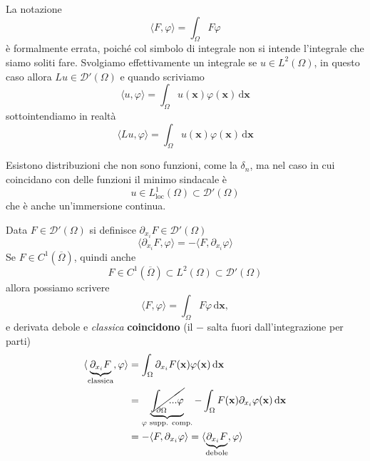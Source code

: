\documentclass[10pt,a4paper,twoside,openright]{book}
\newcommand{\x}{\mathbf{x}}
\newcommand{\de}{\,\mathrm d}
\newcommand{\dxx}{\de \x}
\begin{document}
\begin{nb}
	La notazione 
	\begin{equation*}
		\langle F,\varphi \rangle =\int _{\Omega } F\varphi 
	\end{equation*}
	è formalmente errata, poiché col simbolo di integrale non si intende l'integrale che siamo soliti fare. Svolgiamo effettivamente un integrale se $\displaystyle u\in L^{2}(\Omega)$, in questo caso allora $\displaystyle Lu\in \mathcal{D} '(\Omega)$ e quando scriviamo 
	\begin{equation*}
		\langle u,\varphi \rangle =\int _{\Omega } u(\x) \varphi (\x) \dxx
	\end{equation*}
	sottointendiamo in realtà
	\begin{equation*}
		\langle Lu,\varphi \rangle =\int _{\Omega } u(\x) \varphi (\x) \dxx
	\end{equation*}
\end{nb}
Esistono distribuzioni che non sono funzioni, come la $\displaystyle \delta _{n}$, ma nel caso in cui coincidano con delle funzioni il minimo sindacale è \ 
\begin{equation*}
	u\in L^{1}_{\text{loc}}(\Omega) \subset \mathcal{D} '(\Omega)
\end{equation*}
che è anche un'immersione continua.
\begin{definition}
	 Data $\displaystyle F\in \mathcal{D}'(\Omega)$ si definisce $\displaystyle \partial _{x_{i}} F\in \mathcal{D} '(\Omega)$
	\begin{equation*}
		\langle \partial _{x_{i}} F,\varphi \rangle =-\langle F,\partial _{x_{i}} \varphi \rangle 
	\end{equation*}
	Se $\displaystyle F\in C^{1}(\overline{\Omega })$, quindi anche
	\begin{equation*}
		F\in C^{1}(\overline{\Omega }) \subset L^{2}(\Omega)\mathcal{\subset D} '(\Omega)
	\end{equation*}
	allora possiamo scrivere
	\begin{equation*}
		\langle F,\varphi \rangle =\int _{\Omega } F\varphi \dxx ,
	\end{equation*}
	e derivata debole e \textit{classica} \textbf{coincidono} (il $-$ salta fuori dall'integrazione per parti)
	\begin{align*}
		\langle \underbrace{\partial _{x_{i}} F}_{\text{classica}} ,\varphi \rangle & =\int _{\Omega } \partial _{x_{i}} F(\x) \varphi (\x) \dxx                                                                              \\
		                                                                            & =\underbrace{\cancel{\int _{\partial \Omega } ...\varphi }}_{\varphi \text{ supp. comp.}} -\int _{\Omega } F(\x) \partial _{x_{i}} \varphi (\x)\dxx \\
		                                                                            & =-\langle F,\partial _{x_{i}} \varphi\rangle =\langle \underbrace{\partial _{x_{i}} F}_{\text{debole}} ,\varphi \rangle                                              
	\end{align*}
\end{definition}
\end{document}
